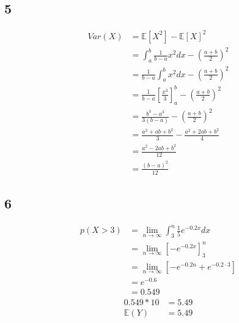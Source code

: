 \documentclass{article}
\begin{document}
\subsection*{5}
\begin{align*}
	Var(X) &= \mathbb{E}[X^2] - \mathbb{E}[X]^2\\
	&= \int_a^b \frac{1}{b-a}x^2 dx - (\frac{a+b}{2})^2\\
	&= \frac{1}{b-a} \int_a^bx^2 dx - (\frac{a+b}{2})^2\\
	&= \frac{1}{b-a}\left[\frac{x^3}{3}\right]_a^b - (\frac{a+b}{2})^2\\
	&= \frac{b^3 - a^3}{3(b-a)} - (\frac{a+b}{2})^2\\
	&= \frac{a^2 + ab + b^2}{3} - \frac{a^2 + 2ab + b^2}{4}\\
	&= \frac{a^2 - 2ab + b^2}{12}\\
	&= \frac{(b-a)^2}{12}
\end{align*}


\subsection*{6}
\begin{align*}
	p(X > 3) &= \lim_{n \to \infty} \int_3^n \frac{1}{5} e^{-0.2x} dx\\
	&= \lim_{n \to \infty} \left[-e^{-0.2x}\right]_3^n\\
	&= \lim_{n \to \infty}[-e^{-0.2n} + e^{-0.2 \cdot 3}]\\
	&= e^{-0.6}\\
	&= 0.549
\end{align*}
\begin{align*}
	0.549*10 &= 5.49\\
	\mathbb{E}(Y)&= 5.49
\end{align*}
\end{document}
